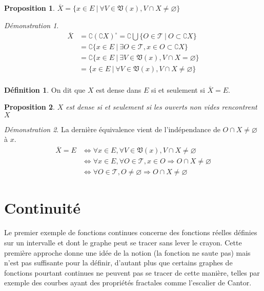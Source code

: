 \documentclass[a4paper, 11pt, french]{book}
\theoremstyle{plain} %
\newtheorem{proposition}{Proposition}
\theoremstyle{definition} %
\newtheorem{definition}{Définition}
\theoremstyle{remark} %
\newtheorem*{demonstration}{Démonstration}
\newcommand{\1}{\mathds{1}}
\newcommand\vide{\varnothing}
\newcommand\ens[2]{\{#1 \ |\ #2\}}
\begin{document}
\begin{proposition}
	$\overline{X}=\ens{x\in E}{\forall V\in\mathfrak{V}(x), V\cap X\neq\vide}$
\end{proposition}

\begin{demonstration}
	\begin{align*}
		\overline{X}
		&=\complement(\complement X)^\circ
		=\complement\bigcup\ens{O\in\mathscr{T}}{O\subset\complement X} \\
		&=\complement\ens{x\in E}{\exists O\in\mathscr{T}, x\in O\subset\complement X} \\
		&=\complement\ens{x\in E}{\exists V\in\mathfrak{V}(x), V\cap X=\vide} \\
		&=\ens{x\in E}{\forall V\in\mathfrak{V}(x), V\cap X\neq\vide} \\
	\end{align*}
\end{demonstration}

\begin{definition}
	On dit que $X$ est dense dans $E$ si et seulement si $\overline{X}=E$.
\end{definition}

\begin{proposition}
	$X$ est dense si et seulement si les ouverts non vides rencontrent $X$
\end{proposition}

\begin{demonstration}
	La dernière équivalence vient de l'indépendance de $O\cap X\neq\vide$ à $x$.
	\begin{align*}
		\overline{X}=E
		&\iff\forall x\in E, \forall V\in\mathfrak{V}(x), V\cap X\neq\vide \\
		&\iff\forall x\in E, \forall O\in\mathscr{T}, x\in O\Rightarrow O\cap X\neq\vide \\
		&\iff\forall O\in\mathscr{T}, O\neq\vide\Rightarrow O\cap X\neq\vide
	\end{align*}
\end{demonstration}

\section{Continuité}

Le premier exemple de fonctions continues concerne des fonctions réelles définies sur un intervalle et dont le graphe peut se tracer sans lever le crayon.
Cette première approche donne une idée de la notion (la fonction ne saute pas) mais n'est pas suffisante pour la définir, d'autant plus que certains graphes de fonctions pourtant continues ne peuvent pas se tracer de cette manière, telles par exemple des courbes ayant des propriétés fractales comme l'escalier de Cantor.
\end{document}
